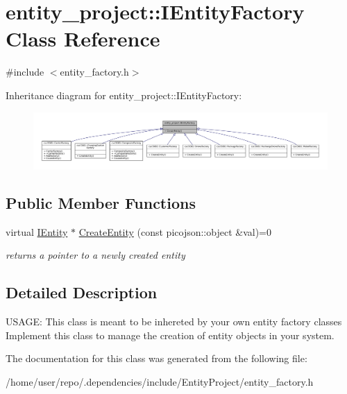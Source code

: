\hypertarget{classentity__project_1_1IEntityFactory}{}\section{entity\+\_\+project\+:\+:I\+Entity\+Factory Class Reference}
\label{classentity__project_1_1IEntityFactory}


{\ttfamily \#include $<$entity\+\_\+factory.\+h$>$}



Inheritance diagram for entity\+\_\+project\+:\+:I\+Entity\+Factory\+:
\nopagebreak
\begin{figure}[H]
\begin{center}
\leavevmode
\includegraphics[width=350pt]{classentity__project_1_1IEntityFactory__inherit__graph}
\end{center}
\end{figure}
\subsection*{Public Member Functions}
\begin{DoxyCompactItemize}
\item 
\mbox{\label{classentity__project_1_1IEntityFactory_ac4e8eaf4294958fef0b98bd3684704bb}} 
virtual \hyperlink{classentity__project_1_1IEntity}{I\+Entity} $\ast$ \hyperlink{classentity__project_1_1IEntityFactory_ac4e8eaf4294958fef0b98bd3684704bb}{Create\+Entity} (const picojson\+::object \&val)=0
\begin{DoxyCompactList}\small\item\em returns a pointer to a newly created entity \end{DoxyCompactList}\end{DoxyCompactItemize}


\subsection{Detailed Description}
U\+S\+A\+GE\+: This class is meant to be inhereted by your own entity factory classes Implement this class to manage the creation of entity objects in your system. 

The documentation for this class was generated from the following file\+:\begin{DoxyCompactItemize}
\item 
/home/user/repo/.\+dependencies/include/\+Entity\+Project/entity\+\_\+factory.\+h\end{DoxyCompactItemize}
